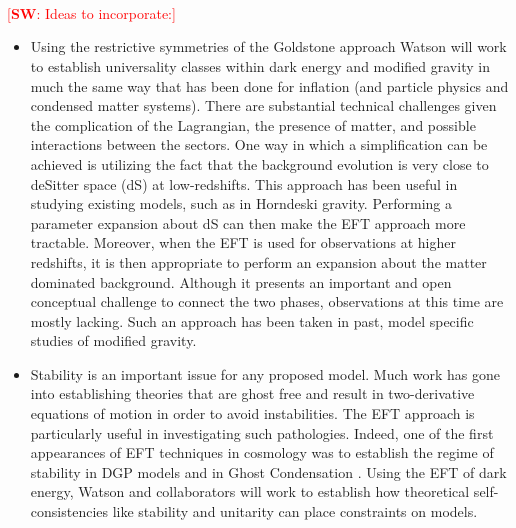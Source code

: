 \documentclass[useAMS,12pt]{article}
\newcommand{\sw}[1]{\textcolor{red}{[{\bf SW}: #1]}}
\begin{document}
\\

\\

\\ 

\sw{Ideas to incorporate:}
\begin{itemize}
\item Using the restrictive symmetries of the Goldstone approach Watson will work to establish universality classes within dark energy and modified gravity in much the same way that has been done for inflation (and particle physics and condensed matter systems).  There are substantial technical challenges given the complication of the Lagrangian, the presence of matter, and possible interactions between the sectors. One way in which a simplification can be achieved is utilizing the fact that the background evolution is very close to deSitter space (dS) at low-redshifts. This approach has been useful in studying existing models, such as in Horndeski gravity. Performing a parameter expansion about dS can then make the EFT approach more tractable. Moreover, when the EFT is used for observations at higher redshifts, it is then appropriate to perform an expansion about the matter dominated background.  Although it presents an important and open conceptual challenge to connect the two phases, observations at this time are mostly lacking.  Such an approach has been taken in past, model specific studies of modified gravity. 
\item Stability is an important issue for any proposed model.  Much work has gone into establishing theories that are ghost free and result in two-derivative equations of motion in order to avoid instabilities. The EFT approach is particularly useful in investigating such pathologies. Indeed, one of the first appearances of EFT techniques in cosmology was to establish the regime of stability in DGP models \cite{Luty:2003vm} and in Ghost Condensation \cite{ArkaniHamed:2003uy}.
Using the EFT of dark energy, Watson and collaborators will work to establish how theoretical self-consistencies like stability and unitarity can place constraints on models. 

\end{itemize}
\end{document}
